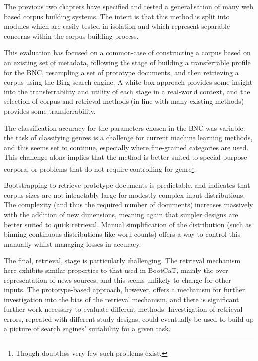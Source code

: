
The previous two chapters have specified and tested a generalisation of many web based corpus building systems.  The intent is that this method is split into modules which are easily tested in isolation and which represent separable concerns within the corpus-building process.

This evaluation has focused on a common-case of constructing a corpus based on an existing set of metadata, following the stage of building a transferrable profile for the BNC, resampling a set of prototype documents, and then retrieving a corpus using the Bing search engine.  A white-box approach provides some insight into the transferrability and utility of each stage in a real-world context, and the selection of corpus and retrieval methods (in line with many existing methods) provides some transferrability.



The classification accuracy for the parameters chosen in the BNC was variable: the task of classifying genres is a challenge for current machine learning methods, and this seems set to continue, especially where fine-grained categories are used.  This challenge alone implies that the method is better suited to special-purpose corpora, or problems that do not require controlling for genre\footnote{Though doubtless very few such problems exist.}.

Bootstrapping to retrieve prototype documents is predictable, and indicates that corpus sizes are not intractably large for modestly complex input distributions.  The complexity (and thus the required number of documents) increases massively with the addition of new dimensions, meaning again that simpler designs are better suited to quick retrieval.  Manual simplification of the distribution (such as binning continuous distributions like word counts) offers a way to control this manually whilst managing losses in accuracy.

The final, retrieval, stage is particularly challenging.  The retrieval mechanism here exhibits similar properties to that used in BootCaT, mainly the over-representation of news sources, and this seems unlikely to change for other inputs.  The prototype-based approach, however, offers a mechanism for further investigation into the bias of the retrieval mechanism, and there is significant further work necessary to evaluate different methods.  Investigation of retrieval errors, repeated with different study designs, could eventually be used to build up a picture of search engines' suitability for a given task.

